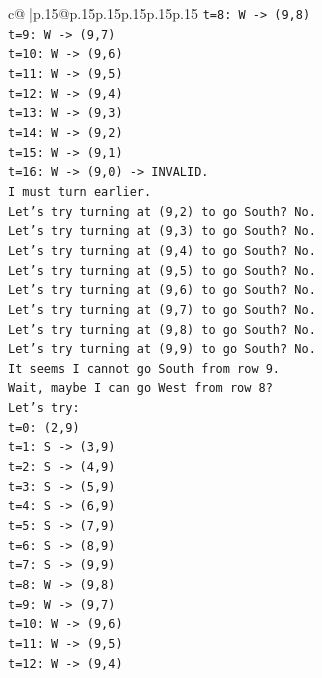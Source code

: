 \documentclass{article}
\begin{document}
{\begin{supertabular}{c@{$\;$}|p{.15\linewidth}@{}p{.15\linewidth}p{.15\linewidth}p{.15\linewidth}p{.15\linewidth}p{.15\linewidth}}
{{{\texttt{t=8: W {-}> (9,8)} \\
\texttt{t=9: W {-}> (9,7)} \\
\texttt{t=10: W {-}> (9,6)} \\
\texttt{t=11: W {-}> (9,5)} \\
\texttt{t=12: W {-}> (9,4)} \\
\texttt{t=13: W {-}> (9,3)} \\
\texttt{t=14: W {-}> (9,2)} \\
\texttt{t=15: W {-}> (9,1)} \\
\texttt{t=16: W {-}> (9,0) {-}> INVALID.} \\
\texttt{I must turn earlier.} \\
\texttt{Let's try turning at (9,2) to go South? No.} \\
\texttt{Let's try turning at (9,3) to go South? No.} \\
\texttt{Let's try turning at (9,4) to go South? No.} \\
\texttt{Let's try turning at (9,5) to go South? No.} \\
\texttt{Let's try turning at (9,6) to go South? No.} \\
\texttt{Let's try turning at (9,7) to go South? No.} \\
\texttt{Let's try turning at (9,8) to go South? No.} \\
\texttt{Let's try turning at (9,9) to go South? No.} \\
\texttt{It seems I cannot go South from row 9.} \\
\texttt{Wait, maybe I can go West from row 8?} \\
\texttt{Let's try:} \\
\texttt{t=0: (2,9)} \\
\texttt{t=1: S {-}> (3,9)} \\
\texttt{t=2: S {-}> (4,9)} \\
\texttt{t=3: S {-}> (5,9)} \\
\texttt{t=4: S {-}> (6,9)} \\
\texttt{t=5: S {-}> (7,9)} \\
\texttt{t=6: S {-}> (8,9)} \\
\texttt{t=7: S {-}> (9,9)} \\
\texttt{t=8: W {-}> (9,8)} \\
\texttt{t=9: W {-}> (9,7)} \\
\texttt{t=10: W {-}> (9,6)} \\
\texttt{t=11: W {-}> (9,5)} \\
\texttt{t=12: W {-}> (9,4)} \\
}}}
\end{supertabular}}
\end{document}
